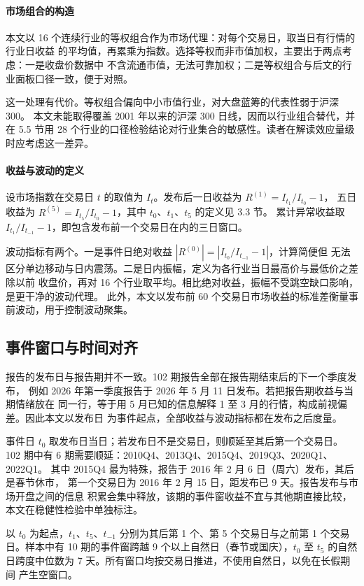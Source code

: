 \paragraph{市场组合的构造}
本文以 16 个连续行业的等权组合作为市场代理：对每个交易日，取当日有行情的行业日收益
的平均值，再累乘为指数。选择等权而非市值加权，主要出于两点考虑：一是收盘价数据中
不含流通市值，无法可靠加权；二是等权组合与后文的行业面板口径一致，便于对照。

这一处理有代价。等权组合偏向中小市值行业，对大盘蓝筹的代表性弱于沪深 300。
本文未能取得覆盖 2001 年以来的沪深 300 日线，因而以行业组合替代，并在 5.5 节用
28 个行业的口径检验结论对行业集合的敏感性。读者在解读效应量级时应考虑这一差异。

\paragraph{收益与波动的定义}
设市场指数在交易日 $t$ 的取值为 $I_t$。发布后一日收益为 $R^{(1)}=I_{t_1}/I_{t_0}-1$，
五日收益为 $R^{(5)}=I_{t_5}/I_{t_0}-1$，其中 $t_0$、$t_1$、$t_5$ 的定义见 3.3 节。
累计异常收益取 $I_{t_1}/I_{t_{-1}}-1$，即包含发布前一个交易日在内的三日窗口。

波动指标有两个。一是事件日绝对收益 $|R^{(0)}|=|I_{t_0}/I_{t_{-1}}-1|$，计算简便但
无法区分单边移动与日内震荡。二是日内振幅，定义为各行业当日最高价与最低价之差除以前
收盘价，再对 16 个行业取平均。相比绝对收益，振幅不受跳空缺口影响，是更干净的波动代理。
此外，本文以发布前 60 个交易日市场收益的标准差衡量事前波动，用于控制波动聚集。

\subsection{事件窗口与时间对齐}

报告的发布日与报告期并不一致。102 期报告全部在报告期结束后的下一个季度发布，
例如 2026 年第一季度报告于 2026 年 5 月 11 日发布。若把报告期收益与当期情绪放在
同一行，等于用 5 月已知的信息解释 1 至 3 月的行情，构成前视偏差。因此本文以发布日
为事件起点，全部收益与波动指标都在发布之后度量。

事件日 $t_0$ 取发布日当日；若发布日不是交易日，则顺延至其后第一个交易日。
102 期中有 6 期需要顺延：2010Q4、2013Q4、2015Q4、2019Q3、2020Q1、2022Q1。
其中 2015Q4 最为特殊，报告于 2016 年 2 月 6 日（周六）发布，其后是春节休市，
第一个交易日为 2016 年 2 月 15 日，距发布已 9 天。报告发布与市场开盘之间的信息
积累会集中释放，该期的事件窗收益不宜与其他期直接比较，本文在稳健性检验中单独标注。

以 $t_0$ 为起点，$t_1$、$t_5$、$t_{-1}$ 分别为其后第 1 个、第 5 个交易日与之前第
1 个交易日。样本中有 10 期的事件窗跨越 9 个以上自然日（春节或国庆），$t_0$ 至 $t_5$
的自然日跨度中位数为 7 天。所有窗口均按交易日推进，不使用自然日，以免在长假期间
产生空窗口。

